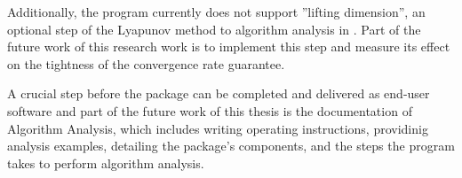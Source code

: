 Additionally, the program currently does not support ''lifting dimension'', an optional step of the Lyapunov method to algorithm analysis in \cite{tutorial}. Part of the future work of this research work is to implement this step and measure its effect on the tightness of the convergence rate guarantee.

A crucial step before the package can be completed and delivered as end-user software and part of the future work of this thesis is the documentation of Algorithm Analysis, which includes writing operating instructions, providinig analysis examples, detailing the package's components, and the steps the program takes to perform algorithm analysis.